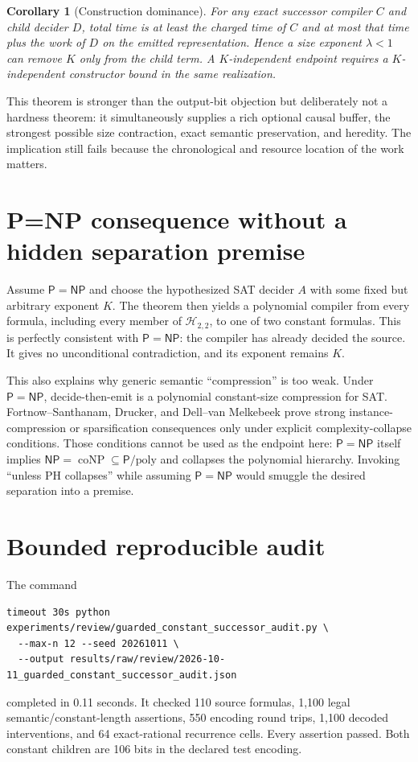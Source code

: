 \documentclass[11pt]{article}
\newtheorem{corollary}[theorem]{Corollary}
\newcommand{\Pclass}{\mathsf P}
\newcommand{\NPclass}{\mathsf{NP}}
\begin{document}
\begin{corollary}[Construction dominance]
For any exact successor compiler $C$ and child decider $D$, total time is
at least the charged time of $C$ and at most that time plus the work of $D$
on the emitted representation.  Hence a size exponent $\lambda<1$ can remove
$K$ only from the child term.  A $K$-independent endpoint requires a
$K$-independent constructor bound in the same realization.
\end{corollary}

This theorem is stronger than the output-bit objection but deliberately not a
hardness theorem: it simultaneously supplies a rich optional causal buffer,
the strongest possible size contraction, exact semantic preservation, and
heredity.  The implication still fails because the chronological and resource
location of the work matters.

\section{P=NP consequence without a hidden separation premise}
Assume $\Pclass=\NPclass$ and choose the hypothesized SAT decider $A$ with
some fixed but arbitrary exponent $K$.  The theorem then yields a polynomial
compiler from every formula, including every member of $\mathcal H_{2,2}$,
to one of two constant formulas.  This is perfectly consistent with
$\Pclass=\NPclass$: the compiler has already decided the source.  It gives no
unconditional contradiction, and its exponent remains $K$.

This also explains why generic semantic ``compression'' is too weak.  Under
$\Pclass=\NPclass$, decide-then-emit is a polynomial constant-size
compression for SAT.  Fortnow--Santhanam, Drucker, and Dell--van Melkebeek
prove strong instance-compression or sparsification consequences only under
explicit complexity-collapse conditions.  Those conditions cannot be used as
the endpoint here: $\Pclass=\NPclass$ itself implies
$\NPclass=\operatorname{coNP}\subseteq\Pclass/\mathrm{poly}$ and collapses
the polynomial hierarchy.  Invoking ``unless PH collapses'' while assuming
$\Pclass=\NPclass$ would smuggle the desired separation into a premise.

\section{Bounded reproducible audit}
The command
\begin{verbatim}
timeout 30s python experiments/review/guarded_constant_successor_audit.py \
  --max-n 12 --seed 20261011 \
  --output results/raw/review/2026-10-11_guarded_constant_successor_audit.json
\end{verbatim}
completed in 0.11 seconds.  It checked 110 source formulas, 1,100 legal
semantic/constant-length assertions, 550 encoding round trips, 1,100 decoded
interventions, and 64 exact-rational recurrence cells.  Every assertion
passed.  Both constant children are 106 bits in the declared test encoding.
\end{document}
